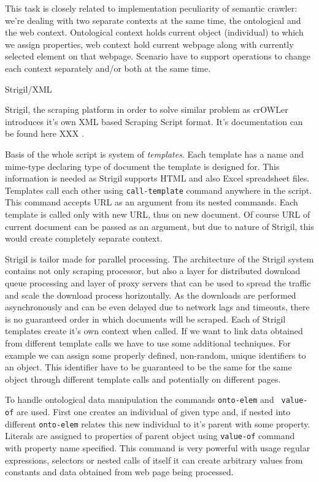 This task is closely related to implementation peculiarity of semantic crawler:
we're dealing with two separate contexts at the same time, the ontological and
the web context. Ontological context holds current object (individual) to which
we assign properties, web context hold current webpage along with currently
selected element on that webpage. Scenario have to support operations to change
each context separately and/or both at the same time. 



\secc Strigil/XML

Strigil, the scraping platform in order to solve similar problem as crOWLer
introduces it's own XML based Scraping Script format. It's documentation can be
found here XXX
. 

Basis of the whole script is system of {\em templates}. Each template has a name
and mime-type declaring type of document the template is designed for. This
information is needed as Strigil supports HTML and also Excel spreadsheet
files. Templates call each other using {\tt call-template} command anywhere in
the script. This command accepts URL as an argument from its nested commands.
Each template is called only with new URL, thus on new document. Of course URL
of current document can be passed as an argument, but due to nature of Strigil,
this would create completely separate context. 

Strigil is tailor made for parallel processing. The architecture of the Strigil
system contains not only scraping processor, but also a layer for distributed
download queue processing and layer of proxy servers that can be used to spread
the traffic and scale the download process horizontally. As the downloads are
performed asynchronously and can be even delayed due to network lags and
timeouts, there is no guaranteed order in which documents will be scraped.
Each of Strigil templates create it's own context when called. If we want to
link data obtained from different template calls we have to use some additional
techniques. For example we can assign some properly defined, non-random, unique
identifiers to an object. This identifier have to be guaranteed to be the same
for the same object through different template calls and potentially on
different pages. 

To handle ontological data manipulation the commands {\tt onto-elem} and {\tt
value-of} are used. First one creates an individual of given type and, if
nested into different {\tt onto-elem} relates this new individual to it's
parent with some property. Literals are assigned to properties of parent object
using {\tt value-of} command with property name specified. This command is very
powerful with usage regular expressions, selectors or nested calls of itself it
can create arbitrary values from constants and data obtained from web page
being processed. 

